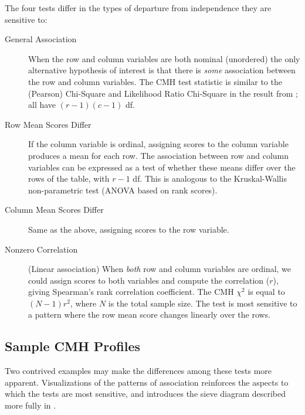 \documentclass[10pt,krantz2]{krantz}\usepackage[]{graphicx}\usepackage[]{color}
\begin{document}
The four tests differ in the types of departure from
independence they are sensitive to:

\begin{description}
\item[General Association]  When the row and column
       variables are both nominal (unordered) the only alternative
       hypothesis of interest is that there is \emph{some} association
       between the row and column variables.  The CMH test statistic
       is similar to the (Pearson) Chi-Square and Likelihood Ratio
       Chi-Square in the result from ; all have \((r - 1) (c -
       1)\) df.

\item[Row Mean Scores Differ]  If the column variable is
       ordinal, assigning scores to the column variable produces a
       mean for each row.  The association between row and column
       variables can be expressed as a test of whether these means
       differ over the rows of the table, with \(r - 1\) df.  This
       is analogous to the Kruskal-Wallis non-parametric test (ANOVA
       based on rank scores).
\item[Column Mean Scores Differ]  Same as the above, assigning scores to
  the row variable.

\item[Nonzero Correlation] (Linear association)  When \emph{both} row and
       column variables are ordinal, we could assign scores to both
       variables and compute the correlation ($r$), giving Spearman's
       rank correlation coefficient.  The CMH
       \(\chi^2\) is equal to \(( N - 1) r^2\), where $N$ is the total
       sample size.  The test is most sensitive to a pattern where
       the row mean score changes linearly over the rows.
\end{description}

\subsection{Sample CMH Profiles}\label{sec:Sample}

Two contrived examples may make the differences among these tests
more apparent.  Visualizations of the patterns of association
reinforces the aspects to which the tests are most sensitive,
and introduces the sieve diagram described more fully in .
\end{document}
